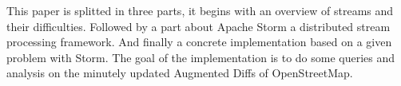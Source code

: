This paper is splitted in three parts, it begins with an overview of streams and their difficulties.
Followed by a part about Apache Storm a distributed stream processing framework.
And finally a concrete implementation based on a given problem with Storm.
The goal of the implementation is to do some queries and analysis on the minutely updated Augmented Diffs of OpenStreetMap.